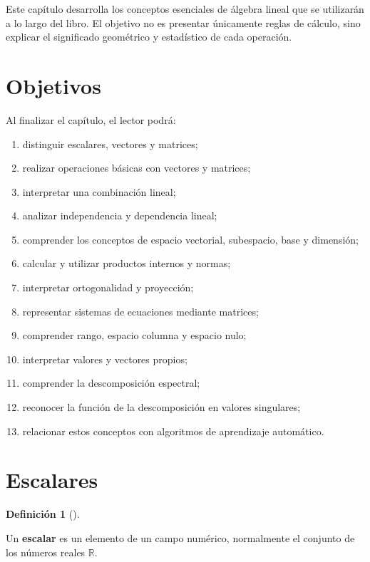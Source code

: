 \documentclass[
  spanish,
  11pt,
  letterpaper,
  DIV=11,
  numbers=noendperiod]{scrreprt}
\providecommand{\tightlist}{%
  \setlength{\itemsep}{0pt}\setlength{\parskip}{0pt}}
\theoremstyle{definition}
\newtheorem{definition}{Definición}[chapter]
\theoremstyle{plain}
\theoremstyle{definition}
\theoremstyle{remark}
\begin{document}
Este capítulo desarrolla los conceptos esenciales de álgebra lineal que
se utilizarán a lo largo del libro. El objetivo no es presentar
únicamente reglas de cálculo, sino explicar el significado geométrico y
estadístico de cada operación.

\section{Objetivos}\label{objetivos-1}

Al finalizar el capítulo, el lector podrá:

\begin{enumerate}
\def\labelenumi{\arabic{enumi}.}
\tightlist
\item
  distinguir escalares, vectores y matrices;
\item
  realizar operaciones básicas con vectores y matrices;
\item
  interpretar una combinación lineal;
\item
  analizar independencia y dependencia lineal;
\item
  comprender los conceptos de espacio vectorial, subespacio, base y
  dimensión;
\item
  calcular y utilizar productos internos y normas;
\item
  interpretar ortogonalidad y proyección;
\item
  representar sistemas de ecuaciones mediante matrices;
\item
  comprender rango, espacio columna y espacio nulo;
\item
  interpretar valores y vectores propios;
\item
  comprender la descomposición espectral;
\item
  reconocer la función de la descomposición en valores singulares;
\item
  relacionar estos conceptos con algoritmos de aprendizaje automático.
\end{enumerate}

\section{Escalares}\label{escalares}

\begin{definition}[]\protect\hypertarget{def-escalar}{}\label{def-escalar}

Un \textbf{escalar} es un elemento de un campo numérico, normalmente el
conjunto de los números reales \(\mathbb{R}\).

\end{definition}
\end{document}
